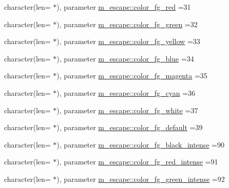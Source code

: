 \begin{DoxyCompactItemize}
\item 
character(len= $\ast$), parameter \mbox{\hyperlink{namespacem__escape_a35eecf0fb916821d94b9c47b2045fe44}{m\+\_\+escape\+::color\+\_\+fg\+\_\+red}} =\textquotesingle{}31\textquotesingle{}
\item 
character(len= $\ast$), parameter \mbox{\hyperlink{namespacem__escape_aeab9b03c1de2c6fb13031c9ca55f9105}{m\+\_\+escape\+::color\+\_\+fg\+\_\+green}} =\textquotesingle{}32\textquotesingle{}
\item 
character(len= $\ast$), parameter \mbox{\hyperlink{namespacem__escape_accc5b67f05d8a2b02ca6f4a0ba38e581}{m\+\_\+escape\+::color\+\_\+fg\+\_\+yellow}} =\textquotesingle{}33\textquotesingle{}
\item 
character(len= $\ast$), parameter \mbox{\hyperlink{namespacem__escape_a01075e619c6af06aac80d73f32263439}{m\+\_\+escape\+::color\+\_\+fg\+\_\+blue}} =\textquotesingle{}34\textquotesingle{}
\item 
character(len= $\ast$), parameter \mbox{\hyperlink{namespacem__escape_ac56b264a4d6c5f3668bac32b791e54de}{m\+\_\+escape\+::color\+\_\+fg\+\_\+magenta}} =\textquotesingle{}35\textquotesingle{}
\item 
character(len= $\ast$), parameter \mbox{\hyperlink{namespacem__escape_a0bbc85c7110c9b67456884baafe31daf}{m\+\_\+escape\+::color\+\_\+fg\+\_\+cyan}} =\textquotesingle{}36\textquotesingle{}
\item 
character(len= $\ast$), parameter \mbox{\hyperlink{namespacem__escape_ae410339e5c6b5468a65e8ce193941ea4}{m\+\_\+escape\+::color\+\_\+fg\+\_\+white}} =\textquotesingle{}37\textquotesingle{}
\item 
character(len= $\ast$), parameter \mbox{\hyperlink{namespacem__escape_aaeff9968bb1e29198469d5d8109e5f41}{m\+\_\+escape\+::color\+\_\+fg\+\_\+default}} =\textquotesingle{}39\textquotesingle{}
\item 
character(len= $\ast$), parameter \mbox{\hyperlink{namespacem__escape_a75d8856bae4a4b8875d48ce2e3a3409a}{m\+\_\+escape\+::color\+\_\+fg\+\_\+black\+\_\+intense}} =\textquotesingle{}90\textquotesingle{}
\item 
character(len= $\ast$), parameter \mbox{\hyperlink{namespacem__escape_a9355532fa2ee17b47e72208480a86707}{m\+\_\+escape\+::color\+\_\+fg\+\_\+red\+\_\+intense}} =\textquotesingle{}91\textquotesingle{}
\item 
character(len= $\ast$), parameter \mbox{\hyperlink{namespacem__escape_a21c7f9b0377ba62dc353e09c05cc5f35}{m\+\_\+escape\+::color\+\_\+fg\+\_\+green\+\_\+intense}} =\textquotesingle{}92\textquotesingle{}

\end{DoxyCompactItemize}

